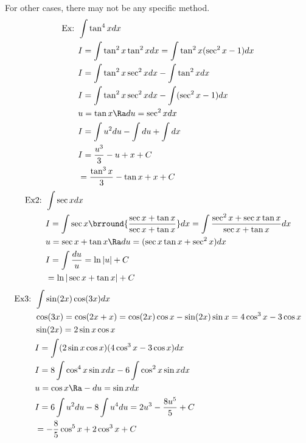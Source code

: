 For other cases, there may not be any specific method.
\begin{align*}
    \text{Ex: }&\int\tan^4xdx\\
    &I=\int\tan^2x\tan^2xdx=\int\tan^2x(\sec^2x-1)dx\\
    &I=\int\tan^2x\sec^2xdx-\int\tan^2xdx\\
    &I=\int\tan^2x\sec^2xdx-\int(\sec^2x-1)dx\\
    &u=\tan x\Ra du=\sec^2xdx\\
    &I=\int u^2du-\int du+\int dx\\
    &I=\frac{u^3}{3}-u+x+C\\
    &=\frac{\tan^3x}{3}-\tan x+x+C
\end{align*}
\begin{align*}
    \text{Ex2: }&\int\sec xdx\\
    &I=\int\sec x\brround{\frac{\sec x+\tan x}{\sec x+\tan x}}dx=\int\frac{\sec^2x+\sec x\tan x}{\sec x+\tan x}dx\\
    &u=\sec x+\tan x\Ra du=(\sec x\tan x+\sec^2x)dx\\
    &I=\int\frac{du}{u}=\ln|u|+C\\
    &=\ln|\sec x+\tan x|+C
\end{align*}
\begin{align*}
    \text{Ex3: }&\int\sin(2x)\cos(3x)dx\\
    &\cos(3x)=\cos(2x+x)=\cos(2x)\cos x-\sin (2x)\sin x=4\cos^3x-3\cos x\\
    &\sin(2x)=2\sin x\cos x\\
    &I=\int(2\sin x\cos x)(4\cos^3x-3\cos x)dx\\
    &I=8\int\cos^4x\sin xdx-6\int\cos^2x\sin xdx\\
    &u=\cos x\Ra -du=\sin xdx\\
    &I=6\int u^2du-8\int u^4du=2u^3-\frac{8u^5}{5}+C\\
    &=-\frac{8}{5}\cos^5x+2\cos^3x+C
\end{align*}
